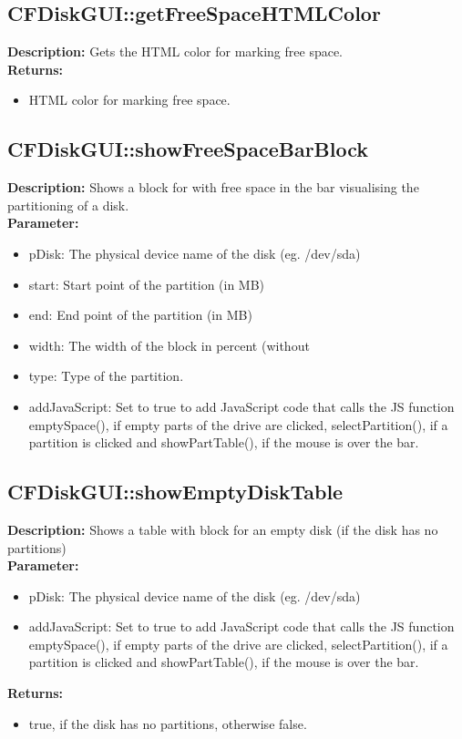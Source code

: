 \subsection{CFDiskGUI::getFreeSpaceHTMLColor}
\textbf{Description:} Gets the HTML color for marking free space.\\
\textbf{Returns:}
\begin{itemize}
\item HTML color for marking free space.
\end{itemize}

\subsection{CFDiskGUI::showFreeSpaceBarBlock}
\textbf{Description:} Shows a block for with free space in the bar visualising the partitioning of a disk.\\
\textbf{Parameter:}
\begin{itemize}
\item pDisk: The physical device name of the disk (eg. /dev/sda)
\item start: Start point of the partition (in MB)
\item end: End point of the partition (in MB)
\item width: The width of the block in percent (without %
\item type: Type of the partition.
\item addJavaScript: Set to true to add JavaScript code that calls the JS function emptySpace(), if empty parts of the drive are clicked, selectPartition(), if a partition is clicked and showPartTable(), if the mouse is over the bar.
\end{itemize}

\subsection{CFDiskGUI::showEmptyDiskTable}
\textbf{Description:} Shows a table with block for an empty disk (if the disk has no partitions)\\
\textbf{Parameter:}
\begin{itemize}
\item pDisk: The physical device name of the disk (eg. /dev/sda)
\item addJavaScript: Set to true to add JavaScript code that calls the JS function emptySpace(), if empty parts of the drive are clicked, selectPartition(), if a partition is clicked and showPartTable(), if the mouse is over the bar.
\end{itemize}
\textbf{Returns:}
\begin{itemize}
\item true, if the disk has no partitions, otherwise false.
\end{itemize}

